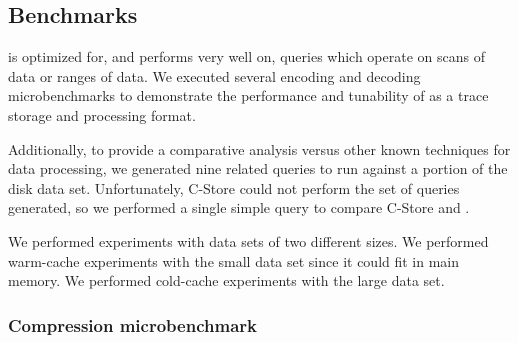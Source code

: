 

\subsection{Benchmarks}\label{sec:perfresults}

\DataSeries{} is optimized for, and performs very well on, queries which
 operate on scans of data or ranges of data.  We executed several
 encoding and decoding microbenchmarks to demonstrate the performance
 and tunability of \DataSeries{} as a trace storage and processing
 format.

Additionally, to provide a comparative analysis versus other known
 techniques for data processing, we generated nine related queries to
 run against a portion of the disk data set.  Unfortunately, C-Store
 could not perform the set of queries generated, so we performed a
 single simple query to compare C-Store and \DataSeries{}.

We performed experiments with data sets of two different sizes.  We
performed warm-cache experiments with the small data set since it
could fit in main memory.  We performed cold-cache experiments with
the large data set.


\subsubsection{Compression microbenchmark}

